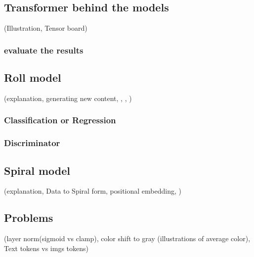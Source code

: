 \subsection{Transformer behind the models}
    (Illustration, Tensor board)

    \subsubsection{evaluate the results}

\subsection{Roll model}
    (explanation, generating new content, , , )    
    
    \subsubsection{Classification or Regression}
    \subsubsection{}
    \subsubsection{Discriminator}


\subsection{Spiral model}
    (explanation, Data to Spiral form, positional embedding, )

\subsection{Problems}
    (layer norm(sigmoid vs clamp), color shift to gray (illustrations of average color), Text tokens vs imgs tokens)